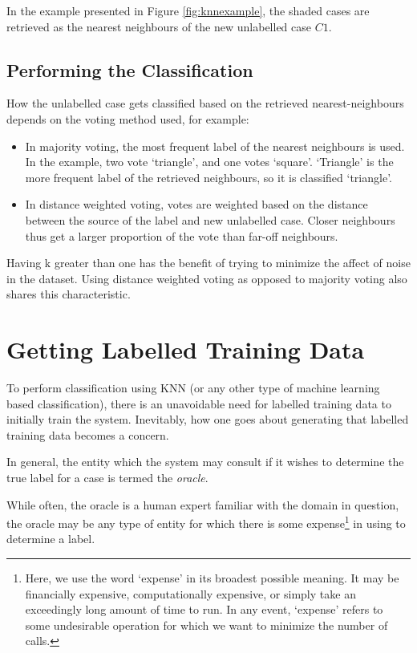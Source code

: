 \documentclass[a4paper,11pt]{report}
\begin{document}
In the example presented in Figure \ref{fig:knnexample}, the shaded cases are retrieved as the nearest neighbours of the new unlabelled case $C1$. 

\subsection{Performing the Classification}

How the unlabelled case gets classified based on the retrieved nearest-neighbours depends on the voting method used, for example:
\begin{itemize}
	\item In majority voting, the most frequent label of the nearest neighbours is used. In the example, two vote `triangle', and one votes `square'. `Triangle' is the more frequent label of the retrieved neighbours, so it is classified `triangle'.
	\item In distance weighted voting, votes are weighted based on the distance between the source of the label and new unlabelled case. Closer neighbours thus get a larger proportion of the vote than far-off neighbours.
\end{itemize}

Having k greater than one has the benefit of trying to minimize the affect of noise in the dataset. Using distance weighted voting as opposed to majority voting also shares this characteristic. 


\section{Getting Labelled Training Data}

To perform classification using KNN (or any other type of machine learning based classification), there is an unavoidable need for labelled training data to initially train the system. Inevitably, how one goes about generating that labelled training data becomes a concern.

In general, the entity which the system may consult if it wishes to determine the true label for a case is termed the \emph{oracle}.

While often, the oracle is a human expert familiar with the domain in question, the oracle may be any type of entity for which there is some expense\footnote{Here, we use the word `expense' in its broadest possible meaning. It may be financially expensive, computationally expensive, or simply take an exceedingly long amount of time to run. In any event, `expense' refers to some undesirable operation for which we want to minimize the number of calls.} in using to determine a label. 
\end{document}
